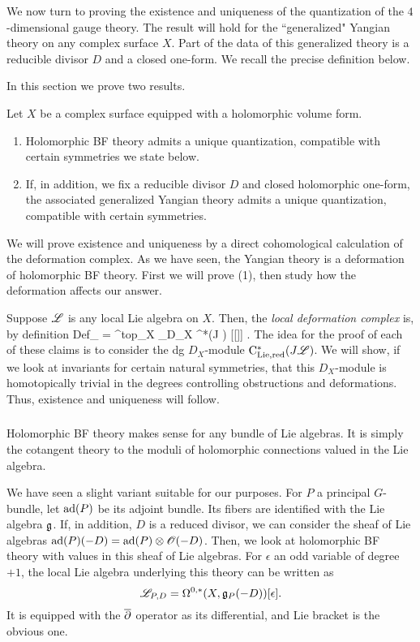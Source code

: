 \documentclass[11pt]{amsart}
\begin{document}
We now turn to proving the existence and uniqueness of the quantization of the $4$-dimensional gauge theory. 
The result will hold for the ``generalized" Yangian theory on any complex surface $X$.
Part of the data of this generalized theory is a reducible divisor $D$ and a closed one-form. 
We recall the precise definition below. 

In this section we prove two results.

\begin{thm}\label{thm: bv quantization}
Let $X$ be a complex surface equipped with a holomorphic volume form. 
\begin{enumerate}
\item Holomorphic BF theory admits a unique quantization, compatible with certain symmetries we state below. 
\item If, in addition, we fix a reducible divisor $D$ and closed holomorphic one-form, the associated generalized Yangian theory admits a unique quantization, compatible with certain symmetries. 
\end{enumerate}
\end{thm}

We will prove existence and uniqueness by a direct cohomological calculation of the deformation complex. 
As we have seen, the Yangian theory is a deformation of holomorphic BF theory.
First we will prove (1), then study how the deformation affects our answer. 

Suppose $\mathscr L$ is any local Lie algebra on $X$. 
Then, the {\em local deformation complex} is, by definition
\beqn\label{def}
{\rm Def}_{\sL} = \Omega^{top}_X \tensor_{D_X} \hbar \cred^*(J \sL) [[\hbar]] .
\eeqn
The idea for the proof of each of these claims is to consider the dg $D_X$-module ${\rm C}_{\rm Lie, red}^*(J \mathscr L)$. 
We will show, if we look at invariants for certain natural symmetries, that this $D_X$-module is homotopically trivial in the degrees controlling obstructions and deformations. 
Thus, existence and uniqueness will follow. 

\subsubsection{}

Holomorphic BF theory makes sense for any bundle of Lie algebras. 
It is simply the cotangent theory to the moduli of holomorphic connections valued in the Lie algebra.

We have seen a slight variant suitable for our purposes. 
For $P$ a principal $G$-bundle, let ${\rm ad}(P)$ be its adjoint bundle.
Its fibers are identified with the Lie algebra $\mathfrak g$. 
If, in addition, $D$ is a reduced divisor, we can consider the sheaf of Lie algebras ${\rm ad}(P)(-D) = {\rm ad}(P) \otimes \mathscr O(-D)$. 
Then, we look at holomorphic BF theory with values in this sheaf of Lie algebras.
For $\epsilon$ an odd variable of degree $+1$, the local Lie algebra underlying this theory can be written as
\[
\mathscr L_{P,D} = \Omega^{0,*}(X , \mathfrak g_P(-D)) [\epsilon] .
\]
It is equipped with the $\overline{\partial}$ operator as its differential, and Lie bracket is the obvious one.
\end{document}

